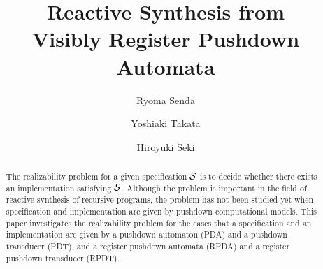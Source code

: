 \documentclass[oribibl,envcountsame,dvipdfmx]{llncs}
\def\calS{{\cal S}}
\begin{document}
\title{Reactive Synthesis from \\ Visibly Register Pushdown Automata}

\author{Ryoma Senda \and Yoshiaki Takata
	\and Hiroyuki Seki}


\maketitle

\begin{abstract}
The realizability problem for
a given specification $\calS$ is to decide
whether there exists an implementation satisfying $\calS$.
Although the problem is important in the field of reactive synthesis
of recursive programs,
the problem has not been studied yet
when specification and implementation are given by
pushdown computational models.
This paper investigates
the realizability problem for the cases that
a specification and an implementation are given by
a pushdown automaton (PDA) and a pushdown transducer (PDT),
and a register pushdown automata (RPDA) and a register pushdown transducer (RPDT).
\end{abstract}











%
\newpage
%
%

%
\newpage

\end{document}
